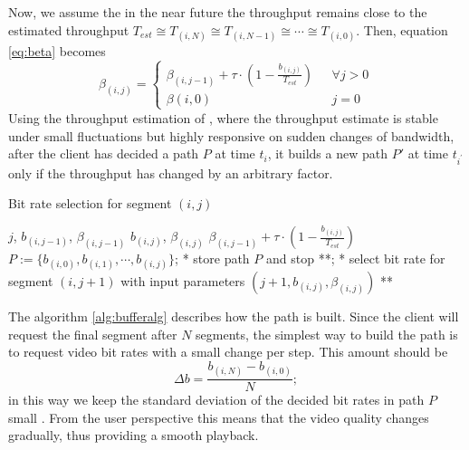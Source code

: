 \documentclass[openany]{book}
\begin{document}
Now, we assume the in the near future the throughput remains close to the estimated throughput $T_{est}\cong T_{(i,N)}\cong T_{(i,N-1)}\cong \cdots \cong T_{(i,0)}$. Then, equation \ref{eq:beta} becomes
\begin{equation}\label{eq:betaest}
\beta_{(i,j)}=\begin{cases}
\beta_{(i,j-1)} + \tau\cdot\left(1-\frac{b_{(i,j)}}{T_{est}}\right)\ \ \ &\forall j>0 \\
\beta{(i,0)} \ \ \ \ &j=0
\end{cases}
\end{equation}
Using the throughput estimation of \cite{throughputest}, where the throughput estimate is stable under small fluctuations but highly responsive on sudden changes of bandwidth, after the client has decided a path $P$ at time $t_i$, it builds a new path $P'$ at time $t_{i^'}$ only if the throughput has changed by an arbitrary factor.

\begin{algorithm}[H]
 \caption{Bit rate selection for segment $(i,j)$}\label{alg:bufferalg}
 \begin{algorithmic}[1]
 \renewcommand{\algorithmicrequire}{\textbf{Input:}}
 \renewcommand{\algorithmicensure}{\textbf{Output:}}
 \REQUIRE $j$, $b_{(i,j-1)}$, $\beta_{(i,j-1)}$
 \ENSURE  $b_{(i,j)}$, $\beta_{(i,j)}$
 	\STATE $\beta_{(i,j-1)} + \tau\cdot\left(1-\frac{b_{(i,j)}}{T_{est}}\right)$
        	\STATE $P := \{b_{(i,0)}, b_{(i,1)}, \cdots , b_{(i,j)}\}$;
            \STATE ** store path $P$ and stop **;
        	\STATE ** select bit rate for segment $(i,j+1)$ with input parameters
            $(j+1, b_{(i,j)}, \beta_{(i,j)})$ **
        \ENDIF
    \ENDIF
 \ENDFOR
 \end{algorithmic}
\end{algorithm}

The algorithm \ref{alg:bufferalg} describes how the path is built. Since the client will request the final segment after $N$ segments, the simplest way to build the path is to request video bit rates with a small change per step. This amount should be
\begin{equation*}
\Delta b = \frac{b_{(i,N)} - b_{(i,0)}}{N};
\end{equation*}
in this way we keep the standard deviation of the decided bit rates in path $P$ small \cite{buffer}. From the user perspective this means that the video quality changes gradually, thus providing a smooth playback.
\end{document}

